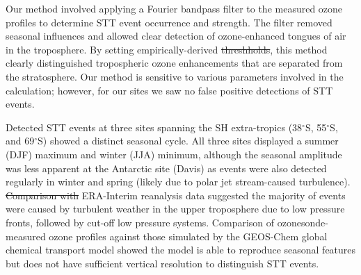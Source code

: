 \documentclass[acp, manuscript]{copernicus} %
\providecommand{\DIFadd}[1]{{\protect\color{blue}\uwave{#1}}} %
\providecommand{\DIFdel}[1]{{\protect\color{red}\sout{#1}}}                      %
\providecommand{\DIFaddbegin}{} %
\providecommand{\DIFaddend}{} %
\providecommand{\DIFdelbegin}{} %
\providecommand{\DIFdelend}{} %
\begin{document}
Our method involved applying a Fourier bandpass filter to the measured ozone profiles to determine STT event occurrence and strength.
The filter removed seasonal influences and allowed clear detection of ozone-enhanced tongues of air in the troposphere.
By setting empirically-derived \DIFdelbegin \DIFdel{threshholds}\DIFdelend \DIFaddbegin \DIFadd{thresholds}\DIFaddend , this method clearly distinguished tropospheric ozone enhancements that are separated from the stratosphere.
Our method is sensitive to various parameters involved in the calculation; however, for our sites we saw no false positive detections of STT events.

Detected STT events at three sites spanning the SH extra-tropics (38$^{\circ}$S, 55$^{\circ}$S, and 69$^{\circ}$S) showed a distinct seasonal cycle.
All three sites displayed a summer (DJF) maximum and winter (JJA) minimum, although the seasonal amplitude was less apparent at the Antarctic site (Davis) as events were also detected regularly in winter and spring (likely due to polar jet stream-caused turbulence).  %
\DIFdelbegin \DIFdel{Comparison with }\DIFdelend \DIFaddbegin \DIFadd{Analysis of }\DIFaddend ERA-Interim reanalysis data suggested the majority of events were caused by turbulent weather in the upper troposphere due to low pressure fronts, followed by cut-off low pressure systems.
Comparison of ozonesonde-measured ozone profiles against those simulated by the GEOS-Chem global chemical transport model showed the model is able to reproduce seasonal features but does not have sufficient vertical resolution to distinguish STT events.
\end{document}
